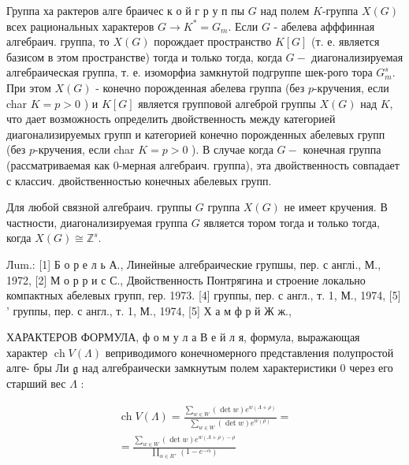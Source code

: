 \documentclass[10pt]{article}
\begin{document}
Группа ха рактеров алге браичес к о й $г$ р у п пы $G$ над полем $K$-группа $X(G)$ всех рациональных характеров $G \rightarrow K^{*}=G_{m}$. Если $G$ - абелева афффинная алгебраич. группа, то $X(G)$ порождает пространство $K[G]$ (т. е. является базисом в этом пространстве) тогда и только тогда, когда $G-$ диагонализируемая алгебраическая группа, т. е. изоморфиа замкнутой подгруппе шек-рого тора $G_{m}^{s}$. При этом $X(G)$ - конечно порожденная абелева группа (без $p$-кручения, если char $K=p>0$ ) и $K[G]$ является групповой алгеброй группы $X(G)$ над $K$, что дает возможность определить двойственность между категорией диагонализируемых групп и категорией конечно порожденных абелевых групп (без $p$-кручения, если char $K=p>0$ ). В случае когда $G-$ конечная группа (рассматриваемая как 0-мерная алгебраич. группа), эта двойственность совпадает с классич. двойственностью конечных абелевых групп.



Для любой связной алгебраич. группы $G$ группа $X(G)$ не имеет кручения. В частности, диагонализируемая группа $G$ является тором тогда и только тогда, когда $X(G) \cong \mathbb{Z}^{s}$.



Лum.: [1] Б о р е л ь А., Линейные алгебраические групшы, пер. с англі., М., 1972, [2] М о р р и с С., Двойственность Понтрягина и строение локально компактных абелевых групп, гер. 1973. [4] группы, пер. с англ., т. 1, М., 1974, [5] ' группы, пер. с англ., т. 1, М., 1974, [5] Х а м ф р й Ж ж.,



ХАРАКТЕРОВ ФОРМУЛА, ф о м у л а В е й л я, формула, выражающая характер $\operatorname{ch} V(\Lambda)$ веприводимого конечномерного представления полупростой алге- бры Ли $\mathfrak{g}$ над алгебраически замкнутым полем характеристики 0 через его старший вес $\Lambda$ :



\[

\begin{gathered}

\operatorname{ch} V(\Lambda)=\frac{\sum_{w \in W}(\operatorname{det} w) e^{w(\Lambda+\rho)}}{\sum_{w \in W}(\operatorname{det} w) e^{w(\rho)}}= \\

=\frac{\sum_{w \in W}(\operatorname{det} w) e^{w(\Lambda+\rho)-\rho}}{\prod_{\alpha \in R^{+}}\left(1-e^{-\alpha}\right)}

\end{gathered}

\]
\end{document}
